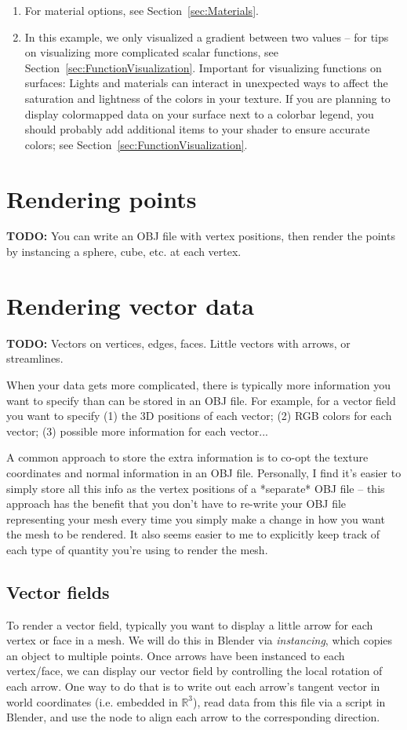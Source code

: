 \documentclass[10pt]{article}
\newcommand{\obj}[1]{\menu{\color{magenta} #1}}
\newcommand{\R}{\mathbb{R}}
\begin{document}
\begin{enumerate}
\begin{figure}[H]
        \label{fig:scalar-data-final}
    \end{figure}
    \item For material options, see Section~\ref{sec:Materials}.
    \item In this example, we only visualized a gradient between two values -- for tips on visualizing more complicated scalar functions, see Section~\ref{sec:FunctionVisualization}. Important for visualizing functions on surfaces: Lights and materials can interact in unexpected ways to affect the saturation and lightness of the colors in your texture. If you are planning to display colormapped data on your surface next to a colorbar legend, you should probably add additional items to your shader to ensure accurate colors; see Section~\ref{sec:FunctionVisualization}. 
\end{enumerate}

\section{Rendering points}
\textbf{TODO:} You can write an OBJ file with vertex positions, then render the points by instancing a sphere, cube, etc. at each vertex.

\section{Rendering vector data}
\textbf{TODO:} Vectors on vertices, edges, faces. Little vectors with arrows, or streamlines.

When your data gets more complicated, there is typically more information you want to specify than can be stored in an OBJ file. For example, for a vector field you want to specify (1) the 3D positions of each vector; (2) RGB colors for each vector; (3) possible more information for each vector...

A common approach to store the extra information is to co-opt the texture coordinates and normal information in an OBJ file. Personally, I find it's easier to simply store all this info as the vertex positions of a *separate* OBJ file -- this approach has the benefit that you don't have to re-write your OBJ file representing your mesh every time you simply make a change in how you want the mesh to be rendered. It also seems easier to me to explicitly keep track of each type of quantity you're using to render the mesh.

\subsection{Vector fields}
To render a vector field, typically you want to display a little arrow for each vertex or face in a mesh. We will do this in Blender via \emph{instancing}, which copies an object to multiple points. Once arrows have been instanced to each vertex/face, we can display our vector field by controlling the local rotation of each arrow. One way to do that is to write out each arrow's tangent vector in world coordinates (i.e. embedded in $\R^3$), read data from this file via a script in Blender, and use the \obj{Align Euler to Vector} node to align each arrow to the corresponding direction.
\end{document}
